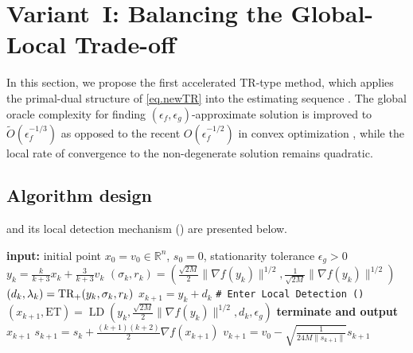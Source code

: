 \documentclass{article}
\begin{document}
\section{Variant~I: Balancing the Global-Local Trade-off}\label{sec.first variant}
In this section, we propose the first accelerated TR-type method, which applies the primal-dual structure of \ref{eq.newTR} into the estimating sequence \cite{nesterov2008accelerating}. The global oracle complexity for finding $(\epsilon_f,\epsilon_g)$-approximate solution is improved to $\tilde O(\epsilon_f^{-1/3})$ as opposed to the recent $O(\epsilon_f^{-1/2})$ in convex optimization \cite{jiang2026beyond}, while the local rate of convergence to the non-degenerate solution remains quadratic.
\subsection{Algorithm design}
 and its local detection mechanism () are presented below.
\begin{algorithm}[ht]
    \caption{Accelerated Trust-Region Method with Local Detection (\atr{})}\label{alg.accelerated utr}
    \begin{algorithmic}[1]
        \STATE \textbf{input:} initial point $x_0=v_0\in \mathbb{R}^n$, $s_0=0$, stationarity tolerance $\epsilon_g>0$
        \STATE $y_k = \frac{k}{k+3}x_k+\frac{3}{k+3}v_k$
        \STATE $(\sigma_k,r_k) = (\tfrac{\sqrt{2M}}{2}\|\nabla f(y_k)\|^{1/2},\tfrac{1}{\sqrt{2M}}\|\nabla f(y_k)\|^{1/2})$
        \label{line.set-params}
        \STATE $(d_k,\lambda_k) = \textrm{TR}_+(y_k,\sigma_k,r_k)$
        \STATE $x_{k+1} = y_k+d_k$
         \label{line.if}
        \STATE \texttt{\# Enter Local Detection ()}
        \STATE $(x_{k+1},\text{ET}) = \operatorname{LD}(y_k,\tfrac{\sqrt{2M}}{2}\|\nabla f(y_k)\|^{1/2},d_k,\epsilon_g)$
        \label{line.early terminate main}
        \STATE \textbf{terminate and output $x_{k+1}$}
        \ENDIF
        \ENDIF
        \STATE $s_{k+1} = s_{k}+\tfrac{(k+1)(k+2)}{2}\nabla f(x_{k+1})$
        \label{line.update-s}
        \STATE $v_{k+1} = v_0-\sqrt{\tfrac{1}{24M\|s_{k+1}\|}}s_{k+1}$
        \label{line.update-v}
        \ENDFOR
    \end{algorithmic}
\end{algorithm}
\end{document}

